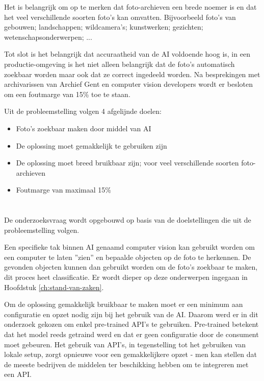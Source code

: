 Het is belangrijk om op te merken dat foto-archieven een brede noemer is en dat het veel verschillende soorten foto's kan omvatten. Bijvoorbeeld foto's van gebouwen; landschappen; wildcamera's; kunstwerken; gezichten; wetenschapsonderwerpen; ...

Tot slot is het belangrijk dat accuraatheid van de AI voldoende hoog is,  in een productie-omgeving is het niet alleen belangrijk dat de foto's automatisch zoekbaar worden maar ook dat ze correct ingedeeld worden. Na besprekingen met archivarissen van Archief Gent en computer vision developers wordt er besloten om een foutmarge van 15\% toe te staan.

Uit de probleemstelling volgen 4 afgelijnde doelen:
\begin{itemize}
    \item Foto's zoekbaar maken door middel van AI
    \item De oplossing moet gemakkelijk te gebruiken zijn
    \item De oplossing moet breed bruikbaar zijn; voor veel verschillende soorten foto-archieven
    \item Foutmarge van maximaal 15\%
\end{itemize}

\section{}
\label{sec:onderzoeksvraag}
De onderzoeksvraag wordt opgebouwd op basis van de doelstellingen die uit de probleemstelling volgen.

Een specifieke tak binnen AI genaamd computer vision kan gebruikt worden om een computer te laten ''zien'' en bepaalde objecten op de foto te herkennen. De gevonden objecten kunnen dan gebruikt worden om de foto's zoekbaar te maken, dit proces heet classificatie. Er wordt dieper op deze onderwerpen ingegaan in Hoofdstuk \ref{ch:stand-van-zaken}.

Om de oplossing gemakkelijk bruikbaar te maken moet er een minimum aan configuratie en opzet nodig zijn bij het gebruik van de AI. Daarom werd er in dit onderzoek gekozen om enkel pre-trained API's te gebruiken. Pre-trained betekent dat het model reeds getraind werd en dat er geen configuratie door de consument moet gebeuren. Het gebruik van API's, in tegenstelling tot het gebruiken van lokale setup, zorgt opnieuwe voor een gemakkelijkere opzet - men kan stellen dat de meeste bedrijven de middelen ter beschikking hebben om te integreren met een API.

